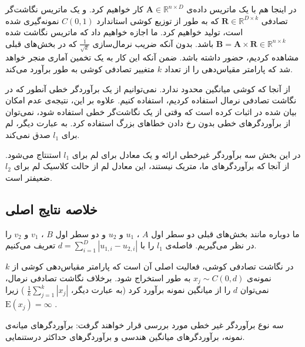 در اینجا هم با یک ماتریس داده‌ی 
$\mathbf{A} \in \mathbb{R}^{n \times D}$
کار خواهیم کرد. و یک ماتریس نگاشت‌گر تصادفی 
$\mathbf{R} \in \mathbb{R}^{D \times k}$
که به طور 
از توزیع کوشی استاندارد 
$C(0,1)$
نمونه‌گیری شده است، تولید خواهیم کرد.
ما اجازه خواهیم داد که ماتریس نگاشت‌ شده 
$\mathbf{B} = \mathbf{A} \times \mathbf{R} \in \mathbb{R}^{n \times k}$
باشد. بدون آنکه ضریب نرمال‌سازی 
$\frac{1}{\sqrt{k}}$
که در بخش‌های قبلی مشاهده کردیم، حضور داشته باشد. ضمن آنکه این کار به یک تخمین آماری منجر خواهد شد که پارامتر مقیاس‌دهی را از تعداد 
$k$
متغییر تصادفی کوشی به طور 
برآورد می‌کند.

از آنجا که کوشی میانگین محدود ندارد. نمی‌توانیم از یک برآوردگر خطی آنطور که در نگاشت تصادفی نرمال استفاده کردیم، استفاده کنیم. علاوه بر این، نتیجه‌ی عدم امکان بیان شده در 
\cite{litez32, litez109, litez33}
اثبات کرده است که وقتی از یک نگاشت‌گر خطی استفاده شود، نمی‌توان از برآوردگرهای خطی بدون رخ دادن خطاهای بزرگ استفاده کرد. به عبارت دیگر، لم
برای 
$l_1$
صدق نمی‌کند.

در این بخش سه برآوردگر غیرخطی ارائه و یک معادل برای لم 
برای 
$l_1$
استنتاج  می‌شود. از آنجا که برآوردگرهای ما، متریک نیستند، این معادل لم 
از حالت کلاسیک لم
برای 
$l_2$
ضعیفتر است.

\subsection{
خلاصه نتایج اصلی
}

ما دوباره مانند بخش‌های قبلی دو سطر اول 
$A$
،
$u_1$
و 
$u_2$
و دو سطر اول 
$B$
،
$v_1$
و 
$v_2$
را در نظر می‌گیریم. فاصله‌ی 
$l_1$
را با 
$d = \sum_{i=1}^D | u_{1,i} - u_{2,i} | $
تعریف می‌کنیم. 

در نگاشت تصادفی کوشی، فعالیت اصلی آن است که پارامتر مقیاس‌دهی کوشی از 
$k$
نمونه‌ی 
$x_j \sim C(0,d)$
به طور 
استخراج شود. برخلاف نگاشت تصادفی نرمال، نمی‌توان 
$d$ 
را از میانگین نمونه برآورد کرد (به عبارت دیگر، 
$\frac{1}{k} \sum_{j=1}^k \left| x_j \right|$
) زیرا 
$\mathrm{E}(x_j) = \infty$
. 

سه نوع برآوردگر غیر خطی مورد بررسی قرار خواهند گرفت: برآوردگرهای میانه‌ی نمونه، برآوردگرهای میانگین هندسی و برآوردگرهای حداکثر درستنمایی.

